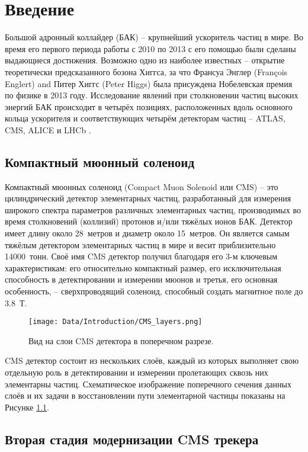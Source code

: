\chapter{Введение}

Большой адронный коллайдер (БАК) -- крупнейший ускоритель частиц в мире. Во время его первого периода работы с 2010 по 2013 с его помощью были сделаны выдающиеся достижения. Возможно одно из наиболее известных -- открытие теоретически предсказанного бозона Хиггса, за что Франсуа Энглер (François Englert) and Питер Хиггс (Peter Higgs) была присуждена Нобелевская премия по физике в 2013 году. Исследование явлений при столкновении частиц высоких энергий БАК происходит в четырёх позициях, расположенных вдоль основного кольца ускорителя и соответствующих четырём детекторам частиц -- ATLAS, CMS, ALICE и LHCb \cite{ref_cern_home}.


\section{Компактный мюонный соленоид}

Компактный мюонных соленоид (Compact Muon Solenoid или CMS) -- это цилиндрический детектор элементарных частиц, разработанный для измерения широкого спектра параметров различных элементарных частиц, производимых во время столкновений (коллизий) протонов и/или тяжёлых ионов БАК. Детектор имеет длину около 28~метров и диаметр около 15~метров. Он является самым тяжёлым детектором элементарных частиц в мире и весит приблизительно 14000~тонн. Своё имя CMS детектор получил благодаря его 3-м ключевым характеристикам: его относительно компактный размер, его исключительная способность в детектировании и измерении мюонов и третья, его основная особенность, -- сверхпроводящий соленоид, способный создать магнитное поле до 3.8~Т.

\begin{figure}[ht]\centering
\texttt{[image: Data/Introduction/CMS\_layers.png]}
\caption{Вид на слои CMS детектора в поперечном разрезе.}
\label{fig:cms_layers}
\end{figure}

CMS детектор состоит из нескольких слоёв, каждый из которых выполняет свою отдельную роль в детектировании и измерении пролетающих сквозь них элементарны частиц. Схематическое изображение поперечного сечения данных слоёв и их задачи в восстановлении пути элементарной частицы показаны на Рисунке \ref{fig:cms_layers}.

\section{Вторая стадия модернизации CMS трекера}

